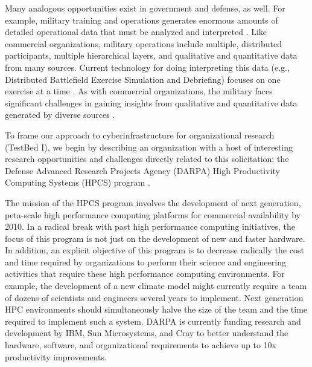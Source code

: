 Many analogous opportunities exist in government and defense, as well.  For
example, military training and operations generates enormous amounts of
detailed operational data that must be analyzed and interpreted
\cite{Carolan04}. Like commercial organizations, military operations
include multiple, distributed participants, multiple hierarchical layers,
and qualitative and quantitative data from many sources. Current technology
for doing interpreting this data (e.g., Distributed Battlefield Exercise
Simulation and Debriefing) focuses on one exercise at a time
\cite{Johnston04}. As with commercial organizations, the military faces
significant challenges in gaining insights from qualitative and
quantitative data generated by diverse sources \cite{Carolan04,Johnston04}.

To frame our approach to cyberinfrastructure for organizational research
(TestBed I), we begin by describing an organization with a host of interesting
research opportunities and challenges directly related to this solicitation: the
Defense Advanced Research Projects Agency (DARPA) High Productivity
Computing Systems (HPCS) program \cite{hpcs}.

The mission of the HPCS program involves the development of next
generation, peta-scale high performance computing platforms for commercial
availability by 2010.  In a radical break with past high performance
computing initiatives, the focus of this program is not just on the
development of new and faster hardware. In addition, an explicit objective
of this program is to decrease radically the cost and time required by
organizations to perform their science and engineering activities that
require these high performance computing environments.  For example, the
development of a new climate model might currently require a team of dozens
of scientists and engineers several years to implement.  Next generation
HPC environments should simultaneously halve the size of the team and the
time required to implement such a system. DARPA is currently funding
research and development by IBM, Sun Microsystems, and Cray to better
understand the hardware, software, and organizational requirements to
achieve up to 10x productivity improvements.  


